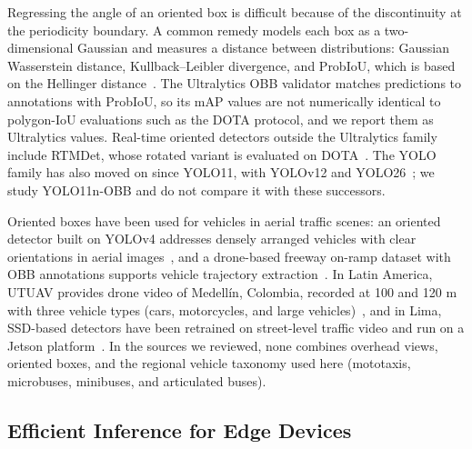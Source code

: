 \documentclass[runningheads]{llncs}
\begin{document}
Regressing the angle of an oriented box is difficult because of the
discontinuity at the periodicity boundary. A common remedy models each box as a
two-dimensional Gaussian and measures a distance between distributions:
Gaussian Wasserstein distance, Kullback--Leibler divergence, and ProbIoU, which
is based on the Hellinger distance~\cite{yang2021gwd,yang2021kld,llerena2021probiou}.
The Ultralytics OBB validator matches predictions to annotations with ProbIoU,
so its mAP values are not numerically identical to polygon-IoU evaluations such
as the DOTA protocol, and we report them as Ultralytics values. Real-time
oriented detectors outside the Ultralytics family include RTMDet, whose rotated
variant is evaluated on DOTA~\cite{lyu2022rtmdet}. The YOLO family has also
moved on since YOLO11, with YOLOv12 and YOLO26~\cite{tian2025yolov12,jocher2026yolo26};
we study YOLO11n-OBB and do not compare it with these successors.

Oriented boxes have been used for vehicles in aerial traffic scenes: an
oriented detector built on YOLOv4 addresses densely arranged vehicles with
clear orientations in aerial images~\cite{lin2022orientedyolov4}, and a
drone-based freeway on-ramp dataset with OBB annotations supports vehicle
trajectory extraction~\cite{wang2025frvehicle}. In Latin America, UTUAV
provides drone video of Medell\'in, Colombia, recorded at 100 and 120 m with
three vehicle types (cars, motorcycles, and large vehicles)~\cite{lepin2026utuav},
and in Lima, SSD-based detectors have been retrained on street-level traffic
video and run on a Jetson platform~\cite{ramossanchez2026jetsonlima}. In the
sources we reviewed, none combines overhead views, oriented boxes, and the
regional vehicle taxonomy used here (mototaxis, microbuses, minibuses, and
articulated buses).

\subsection{Efficient Inference for Edge Devices}
\end{document}
